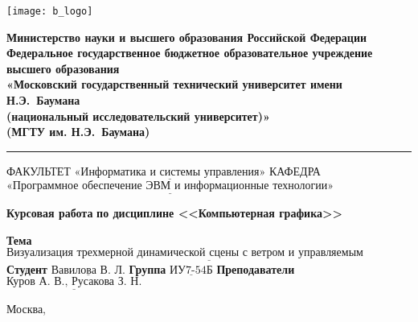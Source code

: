 \thispagestyle{empty}

\noindent \begin{minipage}{0.15\textwidth}
	\texttt{[image: b\_logo]}
\end{minipage}
\noindent\begin{minipage}{0.85\textwidth}\centering
	\textbf{Министерство науки и высшего образования Российской Федерации}\\
	\textbf{Федеральное государственное бюджетное образовательное учреждение высшего образования}\\
	\textbf{«Московский государственный технический университет имени Н.Э.~Баумана}\\
	\textbf{(национальный исследовательский университет)»}\\
	\textbf{(МГТУ им. Н.Э.~Баумана)}
\end{minipage}

\noindent\rule{\linewidth}{3pt}
\newline\newline
\noindent ФАКУЛЬТЕТ $\underline{\text{«Информатика и системы управления»}}$ \newline\newline
\noindent КАФЕДРА $\underline{\text{«Программное обеспечение ЭВМ и информационные технологии»}}$

\vspace{1cm}

\begin{center}
	\noindent\begin{minipage}{1.3\textwidth}\centering
		\Large\textbf{Курсовая работа}\newline
		\textbf{по дисциплине <<Компьютерная графика>>}\newline\newline
	\end{minipage}
\end{center}

\noindent\textbf{Тема} $\underline{\text{Визуализация трехмерной динамической сцены с ветром и управляемым освещением}}$\newline\newline
\noindent\textbf{Студент} $\underline{\text{Вавилова В. Л.}}$\newline\newline
\noindent\textbf{Группа} $\underline{\text{ИУ7-54Б}}$\newline\newline
\noindent\textbf{Преподаватели} $\underline{\text{Куров А. В., Русакова З. Н.}}$\newline

\begin{center}
	\vfill
	Москва,~\the\year
\end{center}
\clearpage
